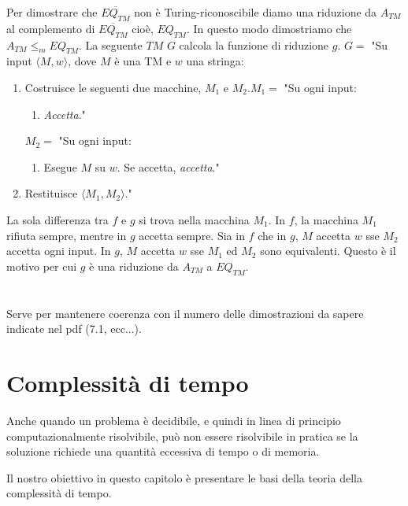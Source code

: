 \documentclass{article}
\begin{document}
Per dimostrare che $\overline{EQ_{TM}}$ non è Turing-riconoscibile diamo una riduzione da $A_{TM}$ al complemento di $\overline{EQ_{TM}}$ cioè, $EQ_{TM}$.
In questo modo dimostriamo che $A_{TM} \leq_m EQ_{TM}$. La seguente $TM$ $G$ calcola la funzione di riduzione $g$. 
\vspace{1em}
\text{}
\newline
$G =$ "Su input $\langle M,w \rangle$, dove $M$ è una TM e $w$ una stringa:
\begin{enumerate}
    \item Costruisce le seguenti due macchine, $M_1$ e $M_2$.\newline $M_1 =$ "Su ogni input: \begin{enumerate}
        \item \textit{Accetta}." \end{enumerate}$M_2 =$ "Su ogni input: \begin{enumerate}
        \item Esegue $M$ su $w$. Se accetta, \textit{accetta}." \end{enumerate}
    \item Restituisce $\langle M_1,M_2 \rangle$."
\end{enumerate}
La sola differenza tra $f$ e $g$ si trova nella macchina $M_1$.
In $f$, la macchina $M_1$ rifiuta sempre, mentre in $g$ accetta sempre.
Sia in $f$ che in $g$, $M$ accetta $w$ sse $M_2$ accetta ogni input.
In $g$, $M$ accetta $w$ sse $M_1$ ed $M_2$ sono equivalenti.
Questo è il motivo per cui $g$ è una riduzione da $A_{TM}$ a $EQ_{TM}$.
\section{}
Serve per mantenere coerenza con il numero delle dimostrazioni da sapere indicate nel pdf (7.1, ecc...).
\section{Complessità di tempo}
Anche quando un problema è decidibile, e quindi in linea di principio computazionalmente risolvibile, può non essere risolvibile in pratica se la soluzione richiede una quantità eccessiva di tempo o di memoria.

Il nostro obiettivo in questo capitolo è presentare le basi della teoria della complessità di tempo.
\end{document}
